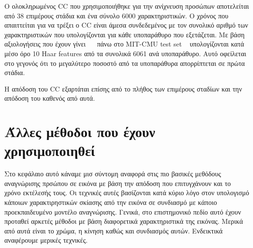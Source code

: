 Ο ολοκληρωμένος CC που χρησιμοποιήθηκε για την ανίχνευση προσώπων αποτελείται
από 38 επιμέρους στάδια και ένα σύνολο 6000 χαρακτηριστικών. Ο χρόνος που
απαιττείται για να τρέξει ο CC είναι άμεσα συνδεδεμένος με τον συνολικό αριθμό των
χαρακτηριστικών που υπολογίζονται για κάθε υποπαράθυρο που εξετάζεται.
Με βάση αξιολογήσεις που έχουν γίνει ~\cite{Viola01rapidobject}~\cite{Viola2004}
πάνω στο MIT-CMU test set ~\cite{Rowley:1998:NNF:275341.275344} υπολογίζονται κατά
μέσο όρο 10 Haar features από τα συνολικά 6061 ανά υποπαράθυρο. Αυτό οφείλεται
στο γεγονός ότι το μεγαλύτερο ποσοστό από τα υποπαράθυρα απορρίπτεται σε πρώτα
στάδια.

Η απόδοση του CC εξαρτάται επίσης από το πλήθος των επιμέρους σταδίων και την
απόδοση του καθενός από αυτά.


\section{Άλλες μέθοδοι που έχουν χρησιμοποιηθεί}\label{sec:othermethods}

Στο κεφάλαιο αυτό κάναμε μισ σύντομη αναφορά στις πιο βασικές μεθόδους αναγνώρισης
πρσώπου σε εικόνα με βάση την απόδοση που επιτυγχάνουν και το χρόνο εκτέλεσής τους.
Οι τεχνικές αυτές βασίζονται κατά κύριο λόγο στον υπολογισμό κάποιων χαρακτιρηστικών
σκίασης από την εικόνα σε συνδιασμό με κάποιο προεκπαιδευμένο μοντέλο αναγνώρισης.
Γενικά, στο επιστημονικό πεδίο αυτό έχουν προταθεί αρκετές μέθοδοι με βάση διαφορετικά
χαρακτηριστικά της εικόνας. Μερικά από αυτά είναι το χρώμα, η κίνηση καθώς και
συνδιασμός αυτών. Ενδεικτικά αναφέρουμε μερικές τεχνικές.


